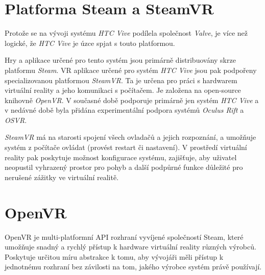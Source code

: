 \section{Platforma Steam a SteamVR}\label{platforma-steam-a-steamvr}

Protože se na vývoji systému \emph{HTC Vive} podílela společnost
\emph{Valve}, je více než logické, že \emph{HTC Vive} je úzce spjat s
touto platformou.

Hry a aplikace určené pro tento systém jsou primárně distribuovány skrze
platformu \emph{Steam}. VR aplikace určené pro systém \emph{HTC Vive}
jsou pak podpořeny specializovanou platformou \emph{SteamVR}. Ta je
určena pro práci s hardwarem virtuální reality a jeho komunikaci s
počítačem. Je založena na open-source knihovně \emph{OpenVR}. V současné
době podporuje primárně jen systém \emph{HTC Vive} a v nedávné době byla
přidána experimentální podpora systémů \emph{Oculus Rift} a \emph{OSVR}. \autocite{steamvrsupports}

\emph{SteamVR} má na starosti spojení všech ovladačů a jejich
rozpoznání, a umožňuje systém z počítače ovládat (provést restart či
nastavení). V prostředí virtuální reality pak poskytuje možnost
konfigurace systému, zajišťuje, aby uživatel neopustil vyhrazený prostor
pro pohyb a další podpůrné funkce důležité pro nerušené zážitky ve
virtuální realitě.

\section{OpenVR}\label{openvr}

OpenVR je multi-platformní API rozhraní vyvíjené společností Steam,
které umožňuje snadný a rychlý přístup k hardware virtuální reality
různých výrobců. Poskytuje určitou míru abstrakce k tomu, aby vývojáři
měli přístup k jednotnému rozhraní bez závilosti na tom, jakého výrobce
systém právě používají.
